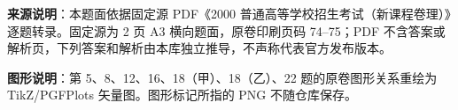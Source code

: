 


\begin{gktip}
\textbf{来源说明}：本题面依据固定源 PDF《2000 普通高等学校招生考试（新课程卷理）》逐题转录。固定源为 2 页 A3 横向题面，原卷印刷页码 74–75；PDF 不含答案或解析页，下列答案和解析由本库独立推导，不声称代表官方发布版本。

\textbf{图形说明}：第 5、8、12、16、18（甲）、18（乙）、22 题的原卷图形关系重绘为 TikZ/PGFPlots 矢量图。图形标记所指的 PNG 不随仓库保存。
\end{gktip}



